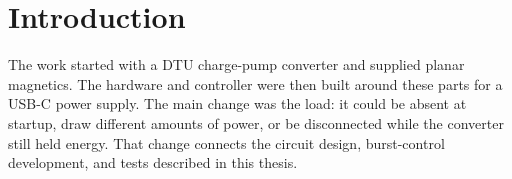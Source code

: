 \chapter{Introduction}
\label{ch:introduction}

The work started with a DTU charge-pump converter and supplied planar magnetics. The hardware and controller were then built around these parts for a USB-C power supply. The main change was the load: it could be absent at startup, draw different amounts of power, or be disconnected while the converter still held energy. That change connects the circuit design, burst-control development, and tests described in this thesis.











